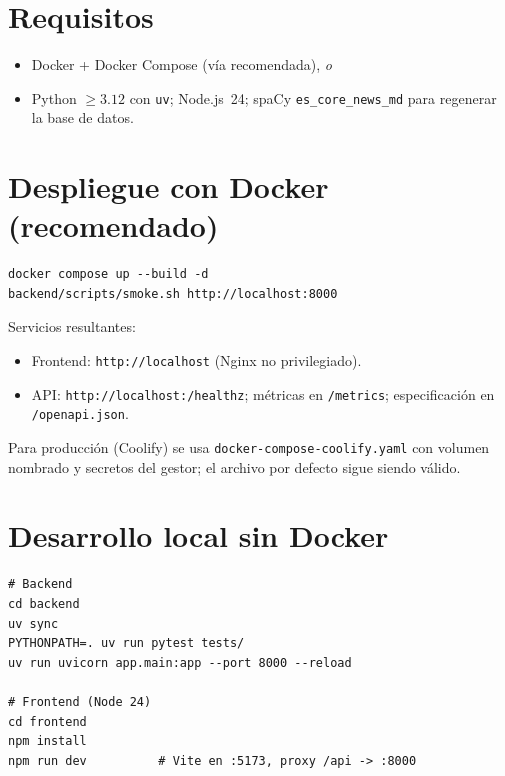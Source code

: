 \documentclass[11pt,letterpaper,twoside]{report}
\newcommand{\codigo}[1]{\texttt{#1}}
\begin{document}
\section{Requisitos}
\begin{itemize}
  \item Docker + Docker Compose (vía recomendada), \emph{o}
  \item Python $\ge 3.12$ con \codigo{uv}; Node.js~24; spaCy
        \codigo{es_core_news_md} para regenerar la base de datos.
\end{itemize}

\section{Despliegue con Docker (recomendado)}
\begin{lstlisting}
docker compose up --build -d
backend/scripts/smoke.sh http://localhost:8000
\end{lstlisting}

Servicios resultantes:
\begin{itemize}
  \item Frontend: \codigo{http://localhost} (Nginx no privilegiado).
  \item API: \codigo{http://\allowbreak localhost:/\allowbreak healthz};
        métricas en \codigo{/metrics}; especificación en
        \codigo{/\allowbreak openapi.json}.
\end{itemize}

Para producción (Coolify) se usa \codigo{docker-compose-coolify.yaml}
con volumen nombrado y secretos del gestor; el archivo por defecto
sigue siendo válido.

\section{Desarrollo local sin Docker}
\begin{lstlisting}
# Backend
cd backend
uv sync
PYTHONPATH=. uv run pytest tests/
uv run uvicorn app.main:app --port 8000 --reload

# Frontend (Node 24)
cd frontend
npm install
npm run dev          # Vite en :5173, proxy /api -> :8000
\end{lstlisting}
\end{document}
